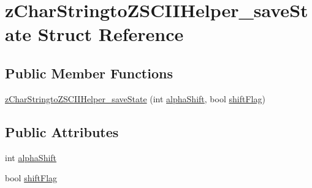 \hypertarget{structz_char_stringto_z_s_c_i_i_helper__save_state}{\section{z\-Char\-Stringto\-Z\-S\-C\-I\-I\-Helper\-\_\-save\-State Struct Reference}
\label{structz_char_stringto_z_s_c_i_i_helper__save_state}
}
\subsection*{Public Member Functions}
\begin{DoxyCompactItemize}
\item 
\hyperlink{structz_char_stringto_z_s_c_i_i_helper__save_state_a1d1d18fcf6483873a0d933be3316273b}{z\-Char\-Stringto\-Z\-S\-C\-I\-I\-Helper\-\_\-save\-State} (int \hyperlink{structz_char_stringto_z_s_c_i_i_helper__save_state_ab9261aec1a4da3630a85089ba3d7ad21}{alpha\-Shift}, bool \hyperlink{structz_char_stringto_z_s_c_i_i_helper__save_state_a9e1b07c9af1aa49e625608ff3e86cc35}{shift\-Flag})
\end{DoxyCompactItemize}
\subsection*{Public Attributes}
\begin{DoxyCompactItemize}
\item 
int \hyperlink{structz_char_stringto_z_s_c_i_i_helper__save_state_ab9261aec1a4da3630a85089ba3d7ad21}{alpha\-Shift}
\item 
bool \hyperlink{structz_char_stringto_z_s_c_i_i_helper__save_state_a9e1b07c9af1aa49e625608ff3e86cc35}{shift\-Flag}
\end{DoxyCompactItemize}


